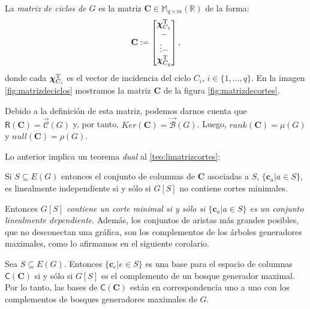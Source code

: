 La \textit{matriz de ciclos de $G$} es la matriz $\mathbf{C} \in \mathbb{M}_{q \times m}(\mathbb{R})$ de la forma: $$\mathbf{C}:= \begin{bmatrix} 
\boldsymbol{\chi}_{C_{1}}^{\textnormal{T}} \\
\-- \\
\vdots
\-- \\
\boldsymbol{\chi}_{C_{q}}^{\textnormal{T}}
\end{bmatrix},
$$ 
donde cada $\boldsymbol{\chi}_{C_{i}}^{\textnormal{T}}$ es el vector de incidencia del ciclo $C_{i}$, $i \in \{1,\ldots, q\}$. En la imagen \ref{fig:matrizdeciclos} mostramos la matriz $\mathbf{C}$ de la figura \ref{fig:matrizdecortes}.

 Debido a la definición de esta matriz, podemos darnos cuenta que $\mathsf{R}(\mathbf{C}) =\overrightarrow{\mathcal{C}}(G)$ y, por tanto, $Ker(\mathbf{C}) = \overrightarrow{\mathcal{B}}(G)$. Luego, $rank(\mathbf{C}) = \mu(G)$ y $null(\mathbf{C}) = \rho(G)$.
 
 Lo anterior implica un teorema \textit{dual} al \ref{teo:limatrizcortes}:
 
\begin{teo}\label{teo:limatrizciclos}
Si $S\subseteq E(G)$ entonces el conjunto de columnas de $\mathbf{C}$ asociadas a $S$, $\{\mathbf{c}_{a}| a \in S\}$, es linealmente independiente si y sólo si $G[S]$ no contiene cortes minimales.
\end{teo}

 
 Entonces \textit{$G[S]$ contiene un corte minimal si y sólo si $\{\mathbf{c}_{a} | a \in S\}$ es un conjunto linealmente dependiente}. Además, los conjuntos de aristas más grandes posibles, que no desconectan una gráfica, son los complementos de los árboles generadores maximales, como lo afirmamos en el siguiente corolario.

\begin{cor} Sea
$S \subseteq E(G)$. Entonces $\{\mathbf{c}_{e} | e \in S\}$ es una base para el espacio de columnas $\mathsf{C}(\mathbf{C})$ si y sólo si $G[S]$ es el complemento de un bosque generador maximal. Por lo tanto, las bases de $\mathsf{C}(\mathbf{C})$ están en correspondencia uno a uno con los complementos de bosques generadores maximales de $G$.
\end{cor} 

